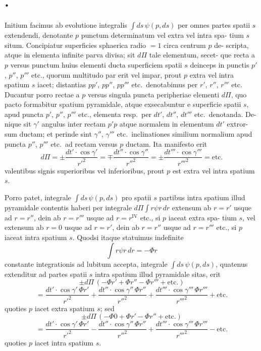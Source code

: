 \documentclass[12pt,a4paper]{article}
\theoremstyle{gauss}
\begin{document}
\newpage
\setcounter{page}{38}

\section*{%
%
\thesection.}

Initium facimus ab evolutione integralis $\int ds\,\psi(p,ds)$ per omnes partes
spatii $s$ extendendi, denotante $p$ punctum determinatum vel extra vel intra spa-
tium $s$ situm. Concipiatur superficies sphaerica radio $=1$ circa centrum $p$ de-
scripta, atque in elementa infinite parva divisa; sit $d\Pi$ tale elementum, secet-
que recta a $p$ versus punctum huius elementi ducta superficiem spatii $s$ deinceps
in punctis $p'$, $p''$, $p'''$ etc., quorum multitudo par erit vel impar, prout $p$ extra vel
intra spatium $s$ iacet; distantias $pp'$, $pp''$, $pp'''$ etc.~denotabimus per $r'$, $r''$, $r'''$ etc.
Ducantur porro rectae a $p$ versus singula puncta peripheriae elementi $d\Pi$, quo
pacto formabitur spatium pyramidale, atque exsecabuntur e superficie spatii $s$,
apud puncta $p'$, $p''$, $p'''$ etc., elementa resp.~per $dt'$, $dt''$, $dt'''$ etc.~denotanda. De-
nique sit $\gamma'$ angulus inter rectam $p'p$ atque normalem in elementum $dt'$ extror-
sum ductam; et perinde sint $\gamma''$, $\gamma'''$ etc.~inclinationes similium normalium apud
puncta $p''$, $p'''$ etc.~ad rectam versus $p$ ductam. Ita manifesto erit
\[
d\Pi = \pm\frac{dt'\cdot\cos\gamma'}{r'^2} = \mp\frac{dt''\cdot\cos\gamma''}{r''^2} = \pm\frac{dt'''\cdot\cos\gamma'''}{r'''^2} = \text{etc.}
\]
valentibus signis superioribus vel inferioribus, prout $p$ est extra vel intra spatium $s$.

Porro patet, integrale $\int ds\,\psi(p,ds)$ pro spatii $s$ partibus intra spatium
illud pyramidale contentis haberi per integrale $d\Pi\int r\psi r\,dr$ extensum ab $r=r'$
usque ad $r=r''$, dein ab $r=r'''$ usque ad $r=r^{\mathrm{IV}}$ etc., si $p$ iaceat extra spa-
tium $s$, vel extensum ab $r=0$ usque ad $r=r'$, dein ab $r=r''$ usque ad
$r=r'''$ etc., si $p$ iaceat intra spatium $s$. Quodsi itaque statuimus indefinite
\[
\int r\psi r\,dr = -\Phi r
\]
constante integrationis ad lubitum accepta, integrale $\int ds\,\psi(p,ds)$, quatenus
extenditur ad partes spatii $s$ intra spatium illud pyramidale sitas, erit
\[
\pm d\Pi\,(-\Phi r' + \Phi r'' - \Phi r''' + \text{etc.})
\]
\[
= \frac{dt'\cdot\cos\gamma'\,\Phi r'}{r'^2} + \frac{dt''\cdot\cos\gamma''\,\Phi r''}{r''^2} + \frac{dt'''\cdot\cos\gamma'''\,\Phi r'''}{r'''^2} + \text{etc.}
\]
quoties $p$ iacet extra spatium $s$; sed
\[
\pm d\Pi\,(-\Phi 0 + \Phi r' - \Phi r'' + \text{etc.})
\]
\[
= \frac{dt'\cdot\cos\gamma'\,\Phi r'}{r'^2} - \frac{dt''\cdot\cos\gamma''\,\Phi r''}{r''^2} + \frac{dt'''\cdot\cos\gamma'''\,\Phi r'''}{r'''^2} - \text{etc.}
\]
quoties $p$ iacet intra spatium $s$.
\end{document}
